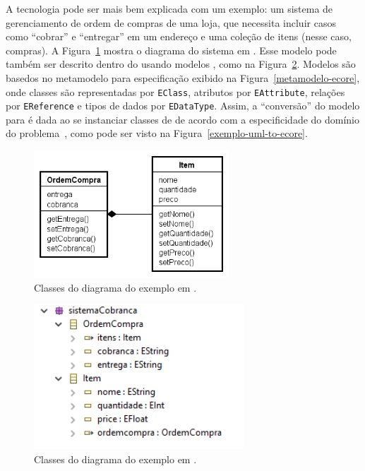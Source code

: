 A tecnologia \emf pode ser mais bem explicada com um exemplo: um sistema de gerenciamento de ordem de compras de uma loja, que necessita incluir casos como ``cobrar'' e ``entregar'' em um endereço e uma coleção de itens (nesse caso, compras). A Figura~\ref{exemplo-uml} mostra o diagrama do sistema em \uml. Esse modelo pode também ser descrito dentro do \emf usando modelos \ecore, como na Figura~\ref{exemplo-ecore}. Modelos \ecore são basedos no metamodelo para especificação exibido na Figura~\ref{metamodelo-ecore}, onde classes são representadas por \texttt{EClass}, atributos por \texttt{EAttribute}, relações por \texttt{EReference} e tipos de dados por \texttt{EDataType}. Assim, a ``conversão'' do modelo \uml para \ecore é dada ao se instanciar classes de \ecore de acordo com a especificidade do domínio do problema~\cite{steinberg2008emf}, como pode ser visto na Figura~\ref{exemplo-uml-to-ecore}. 

\begin{figure}
	\centering
	\includegraphics[width=0.65\textwidth]{figuras/exemplos-emf/exemplo-uml.png}
	\caption{Classes do diagrama do exemplo em \uml.}
	\label{exemplo-uml}
\end{figure}

\begin{figure}
	\centering
	\includegraphics[width=0.7\textwidth]{figuras/exemplos-emf/exemplo-ecore.PNG}
	\caption{Classes do diagrama do exemplo em \ecore.}
	\label{exemplo-ecore}
\end{figure}


